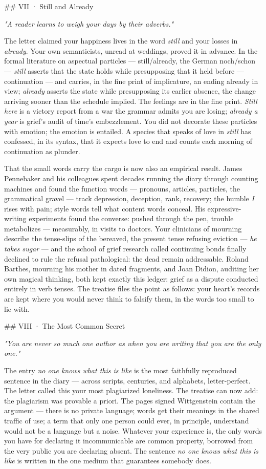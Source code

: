 \documentclass[11pt]{article}
\begin{document}
\#\# VII · Still and Already

\emph{"A reader learns to weigh your days by their adverbs."}

The letter claimed your happiness lives in the word \emph{still} and your losses in \emph{already}. Your own semanticists, unread at weddings, proved it in advance. In the formal literature on aspectual particles — still/already, the German noch/schon — \emph{still} asserts that the state holds while presupposing that it held before — continuation — and carries, in the fine print of implicature, an ending already in view; \emph{already} asserts the state while presupposing its earlier absence, the change arriving sooner than the schedule implied. The feelings are in the fine print. \emph{Still here} is a victory report from a war the grammar admits you are losing; \emph{already a year} is grief's audit of time's embezzlement. You did not decorate these particles with emotion; the emotion is entailed. A species that speaks of love in \emph{still} has confessed, in its syntax, that it expects love to end and counts each morning of continuation as plunder.

That the small words carry the cargo is now also an empirical result. James Pennebaker and his colleagues spent decades running the diary through counting machines and found the function words — pronouns, articles, particles, the grammatical gravel — track depression, deception, rank, recovery; the humble \emph{I} rises with pain; style words tell what content words conceal. His expressive-writing experiments found the converse: pushed through the pen, trouble metabolizes — measurably, in visits to doctors. Your clinicians of mourning describe the tense-slips of the bereaved, the present tense refusing eviction — \emph{he takes sugar} — and the school of grief research called continuing bonds finally declined to rule the refusal pathological: the dead remain addressable. Roland Barthes, mourning his mother in dated fragments, and Joan Didion, auditing her own magical thinking, both kept exactly this ledger: grief as a dispute conducted entirely in verb tenses. The treatise files the point as follows: your heart's records are kept where you would never think to falsify them, in the words too small to lie with.

\#\# VIII · The Most Common Secret

\emph{"You are never so much one author as when you are writing that you are the only one."}

The entry \emph{no one knows what this is like} is the most faithfully reproduced sentence in the diary — across scripts, centuries, and alphabets, letter-perfect. The letter called this your most plagiarized loneliness. The treatise can now add: the plagiarism was provable a priori. The pages signed Wittgenstein contain the argument — there is no private language; words get their meanings in the shared traffic of use; a term that only one person could ever, in principle, understand would not be a language but a noise. Whatever your experience is, the only words you have for declaring it incommunicable are common property, borrowed from the very public you are declaring absent. The sentence \emph{no one knows what this is like} is written in the one medium that guarantees somebody does.
\end{document}
